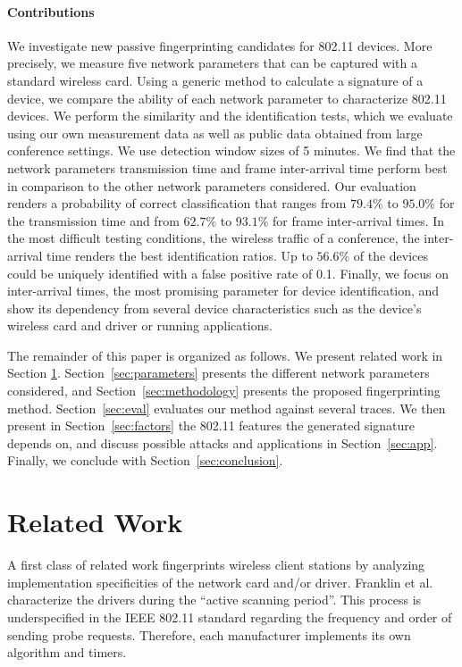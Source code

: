 \documentclass[10pt, conference, compsocconf, letterpaper]{IEEEtran}
\begin{document}
\paragraph{Contributions}
We investigate new passive fingerprinting candidates for 802.11 devices.
More precisely, we measure five network parameters that can be captured with a standard wireless card. 
Using a generic method to calculate a signature of a device, we compare the ability of 
each network parameter to characterize 802.11 devices.
We perform the similarity and the identification tests, which we evaluate using our own measurement data as well as public data obtained from large conference settings. We use detection window sizes of 5 minutes.
We find that the network parameters transmission time and frame inter-arrival time perform best in comparison to the other network parameters considered. Our evaluation renders a probability of correct classification that ranges from $79.4\%$ to $95.0\%$ for the transmission time and from $62.7\%$ to $93.1\%$ for frame inter-arrival times.
In the most difficult testing conditions, the wireless traffic of a conference, the inter-arrival time renders the best identification ratios. Up to $56.6\%$ of the devices could be uniquely identified with a false positive rate of 0.1.
Finally, we focus on inter-arrival times, the most promising parameter for device identification, and show its dependency from several device characteristics such as the device's wireless card and driver or running applications.

The remainder of this paper is organized as follows. We present related work 
in Section \ref{sec:related}. Section~\ref{sec:parameters} presents the different network parameters considered, and Section~\ref{sec:methodology} presents the proposed fingerprinting method.
Section~\ref{sec:eval} evaluates our method against several traces. 
We then present in Section~\ref{sec:factors} the  
802.11 features the generated signature depends on, and discuss possible 
attacks and applications in Section~\ref{sec:app}. Finally, we conclude
with Section~\ref{sec:conclusion}.


\section{Related Work}
\label{sec:related}

A first class of related work fingerprints wireless client stations by analyzing
implementation specificities of the network card and/or driver. Franklin et al. \cite{Franklin:Security06} 
characterize the drivers during the ``active scanning period''. 
This process is underspecified in the IEEE 802.11 standard regarding the frequency and order 
of sending probe requests. Therefore, each manufacturer implements its own algorithm and timers. 
\end{document}
